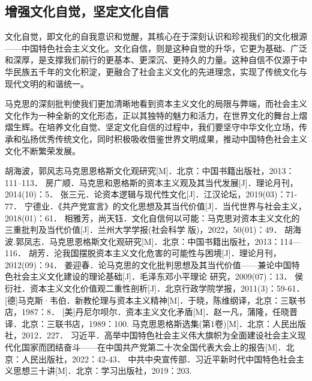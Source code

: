 \documentclass[a4paper]{ctexart}
\begin{document}
\subsection{增强文化自觉，坚定文化自信}
文化自觉，即文化的自我意识和觉醒，其核心在于深刻认识和珍视我们的文化根源——中国特色社会主义文化。文化自信，则是这种自觉的升华，它更为基础、广泛和深厚，是支撑我们前行的更基本、更深沉、更持久的力量。这种自信不仅源于中华民族五千年的文化积淀，更融合了社会主义文化的先进理念，实现了传统文化与现代文明的和谐统一。

马克思的深刻批判使我们更加清晰地看到资本主义文化的局限与弊端，而社会主义文化作为一种全新的文化形态，正以其独特的魅力和活力，在世界文化的舞台上熠熠生辉。在培养文化自觉、坚定文化自信的过程中，我们要坚守中华文化立场，传承和弘扬优秀传统文化，同时积极吸收借鉴世界文明成果，推动中国特色社会主义文化不断繁荣发展。

\newpage
\fontsize{10pt}{13pt}\selectfont 
\begin{thebibliography}{99}%
胡海波，郭风志马克思恩格斯文化观研究[M]．北京：中国书籍出版社，2013：111--113．
房广顺．马克思和恩格斯的资本主义观及其当代发展[J]．理论月刊，2014(10)：5．
张三元．论资本逻辑与现代性文化[J]．江汉论坛，2019(03)：71-77．
宁德业．《共产党宣言》的文化思想及其当代价值[J]．当代世界与社会主义，2018(01)：61．
相雅芳，尚天钰．文化自信何以可能：马克思对资本主义文化的三重批判及当代价值[J]．兰州大学学报(社会科学 版)，2022，50(01)：49．
胡海波.郭凤志．马克思恩格斯文化观研究[M]．北京：中国书籍出版社，2013：114—116．
胡芳．沦我国摆脱资本主义文化危害的可能性与困境[J]．理论月刊，2012(09)：94．
姜迎春．论马克思的文化批判思想及其当代价值——兼论中国特色社会主义文化建设的理论基础[J]．毛泽东邓小平理论 研究，2009(07)：13．
侯衍社．资本主义文化价值观二重性剖析[J]．北京行政学院学报，2011(3)：59-61．
[德]马克斯·韦伯．新教伦理与资本主义精神[M]．于晓，陈维纲译，北京：三联书店，1987：8．
[美]丹尼尔呗尔．资本主义文化矛盾[M]．赵一凡，蒲隆，任晓晋译．北京：三联书店，1989：100.
马克思恩格斯选集(第1卷)[M]．北京：人民出版社，2012．227．
习近平．高举中国特色社会主义伟大旗帜\quad 为全面建设社会主义现代化国家而团结奋斗------在中国共产党第二十次全国代表大会上的报告[M]．北京：人民出版社，2022：42-43．
中共中央宣传部．习近平新时代中国特色社会主义思想三十讲[M]．北京：学习出版社，2019：203.
\end{thebibliography}
\end{document}
